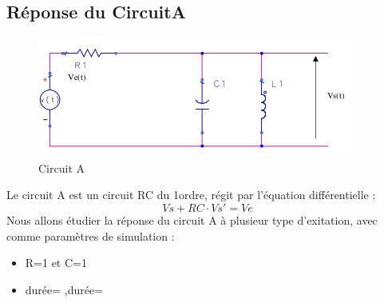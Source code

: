 \documentclass[a4paper,11pt]{article}
\begin{document}
  \subsection{Réponse du CircuitA}
  \begin{figure}[H]
	 \begin{center}
	\includegraphics[scale=.7]{circuitTest}
	\caption{Circuit A}
	\end{center}
      \end{figure}
   Le circuit A est un circuit RC du 1\ier ordre, régit par l'équation différentielle :
   \begin{equation*}
    Vs+RC\cdot Vs'=Ve
   \end{equation*}
  Nous allons étudier la réponse du circuit A à plusieur type d'exitation, avec comme paramètres de simulation :  \\
  \begin{itemize}
   \item R=1 et C=1
   \item durée= ,durée= 
  \end{itemize}
\end{document}
